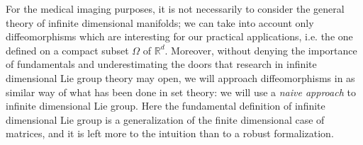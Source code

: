 For the medical imaging purposes, it is not necessarily to consider the general theory of infinite dimensional manifolds; we can take into account only diffeomorphisms which are interesting for our practical applications, i.e. the one defined on a compact subset $\Omega$ of $\mathbb{R}^d$. Moreover, without denying the importance of fundamentals and underestimating the doors that research in infinite dimensional Lie group theory may open, we will approach diffeomorphisms in as similar way of what has been done in set theory: we will use a \emph{naive approach} to infinite dimensional Lie group. 
Here the fundamental definition of infinite dimensional Lie group is a generalization of the finite dimensional case of matrices, and it is left more to the intuition than to a robust formalization. 




